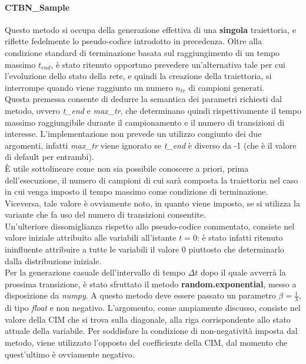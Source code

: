   \paragraph{CTBN\_Sample}
  Questo metodo si occupa della generazione effettiva di una \textbf{singola} traiettoria, e riflette
  fedelmente lo pseudo-codice introdotto in precedenza. Oltre alla condizione standard di terminazione
  basata sul raggiungimento di un tempo massimo $t_{end}$, è stato ritenuto opportuno prevedere
  un'alternativa tale per cui l'evoluzione dello stato della rete, e quindi la creazione della traiettoria,
  si interrompe quando viene raggiunto un numero $n_{tr}$ di campioni generati.\\
  Questa premessa consente di dedurre la semantica dei parametri richiesti dal metodo, ovvero \textit{t\_end}
  e \textit{max\_tr}, che determinano quindi rispettivamente il tempo massimo raggiungibile durante 
  il campionamento e il numero di transizioni di interesse. L'implementazione non prevede un utilizzo
  congiunto dei due argomenti, infatti \textit{max\_tr} viene ignorato se \textit{t\_end} è diverso da -1
  (che è il valore di default per entrambi).\\ 
  È utile sottolineare come non sia possibile conoscere a priori, prima dell'esecuzione, il numero
  di campioni di cui sarà composta la traiettoria nel caso in cui venga imposto il tempo massimo
  come condizione di terminazione. Viceversa, tale valore è ovviamente noto, in quanto viene imposto, 
  se si utilizza la variante che fa uso del numero di transizioni consentite.\\
  Un'ulteriore dissomiglianza rispetto allo pseudo-codice commentato, consiste nel valore iniziale attribuito
  alle variabili all'istante $t = 0$: è stato infatti ritenuto ininfluente attribuire a tutte le variabili
  il valore 0 piuttosto che determinarlo dalla distribuzione iniziale.\\
  Per la generazione casuale dell'intervallo di tempo $\Delta t$ dopo il quale avverrà la prossima 
  transizione, è stato sfruttato il metodo \textbf{random.exponential}, messo a disposizione da \textit{numpy}.
  A questo metodo deve essere passato un parametro $\beta = \frac{1}{\lambda}$, di tipo \textit{float}
  e non negativo. L'argomento, come ampiamente discusso, consiste nel valore della CIM che si trova 
  sulla diagonale, alla riga corrispondente allo stato attuale della variabile. Per soddisfare la condizione di non-negatività 
  imposta dal metodo, viene utilizzato l'opposto del coefficiente della CIM, dal momento che quest'ultimo è ovviamente negativo.\\
